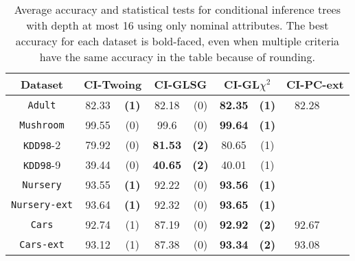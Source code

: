     \begin{table}
    \small
      \centering
        \caption{Average accuracy and statistical tests  for  conditional inference trees 
with depth at most 16 using only nominal attributes. The best accuracy for each dataset is bold-faced, even when multiple criteria have the same accuracy in the table because of rounding.}

\begin{tabular}{c|cc|cc|cc|cc} 
Dataset             & \multicolumn{2}{c|}{CI-Twoing} &   \multicolumn{2}{c|}{CI-GLSG} & \multicolumn{2}{c|}{CI-GL$\chi^2$} & \multicolumn{2}{c}{CI-PC-ext}\\  \hline   
{\tt Adult}         & 82.33      &  {\bf (1)}        &   82.18      & (0)             & {\bf 82.35} &  {\bf (1)}           & 82.28       &                \\
{\tt Mushroom}      &  99.55     &  (0)              &   99.6       & (0)             & {\bf 99.64} &  {\bf (1)}           &             &                \\
{\tt KDD98}-2       &79.92       &  (0)              &  {\bf 81.53} & {\bf (2)}       &  80.65      &  (1)                 &             &                \\
{\tt KDD98}-9       & 39.44      &  (0)              &  {\bf 40.65} & {\bf (2)}       &  40.01      &  (1)                 &             &                \\
{\tt Nursery}       & 93.55      &  {\bf (1)}        &   92.22      & (0)             & {\bf 93.56} &  {\bf (1)}           &             &                \\
{\tt Nursery-ext}   & 93.64      &  {\bf (1)}        &   92.32      & (0)             & {\bf 93.65} &  {\bf (1)}           &             &                \\
{\tt Cars}          & 92.74      &  (1)              &   87.19      & (0)             & {\bf 92.92} &  {\bf (2)}           & 92.67       &                \\
{\tt Cars-ext}      & 93.12      &  (1)              &   87.38      & (0)             & {\bf 93.34} &  {\bf (2)}           & 93.08       &                \\

\end{tabular}
\end{table}
